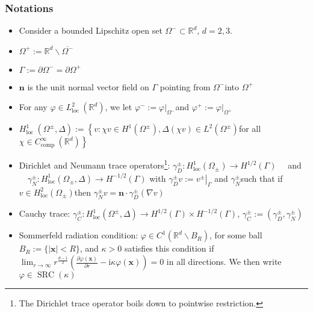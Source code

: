 \documentclass[10pt,journal,compsoc, onecolumn]{IEEEtran}
\begin{document}
\subsubsection{Notations}
\begin{itemize}
    \item Consider a bounded Lipschitz open set $\Omega^{-} \subset \mathbb{R}^{d}$, $d=2,3$.
    \item \(\Omega^{+}:=\mathbb{R}^{d} \backslash \overline{\Omega^{-}}\)
    \item \(\Gamma:=\partial \Omega^{-}=\partial \Omega^{+}\)
    \item \(\mathbf{n}\) is the unit normal vector field on \(\Gamma\) pointing from \(\Omega^{-}\)into \(\Omega^{+}\)
    \item For any \(\varphi \in L_{\text {loc }}^{2}\left(\mathbb{R}^{d}\right)\), we let \(\varphi^{-}:=\left.\varphi\right|_{\Omega^{-}}\)and \(\varphi^{+}:=\left.\varphi\right|_{\Omega^{+}}\)
    \item \(H_{\text {loc }}^{1}\left(\Omega^{\pm}, \Delta\right):=\left\{v: \chi v \in H^{1}\left(\Omega^{\pm}\right), \Delta(\chi v) \in L^{2}\left(\Omega^{\pm}\right)\right.\)for all \(\left.\chi \in C_{\text {comp }}^{\infty}\left(\mathbb{R}^{d}\right)\right\}\)
    \item Dirichlet and Neumann trace operators\footnote{The Dirichlet trace operator boils down to pointwise restriction.}: \(\gamma_{D}^{\pm}: H_{\mathrm{loc}}^{1}\left(\Omega_{\pm}\right) \rightarrow H^{1 / 2}(\Gamma) \quad\) and \(\quad \gamma_{N}^{\pm}: H_{\mathrm{loc}}^{1}\left(\Omega_{\pm}, \Delta\right) \rightarrow H^{-1 / 2}(\Gamma)\) with \(\gamma_{D}^{\pm} v:=\left.v^{\pm}\right|_{\Gamma}\) and \(\gamma_{N}^{\pm}\)such that if \(v \in H_{\mathrm{loc}}^{2}\left(\Omega_{\pm}\right)\)then \(\gamma_{N}^{\pm} v=\mathbf{n} \cdot \gamma_{D}^{\pm}(\nabla v)\)
    \item Cauchy trace: \(\gamma_{C}^{\pm}: H_{\mathrm{loc}}^{1}\left(\Omega^{\pm}, \Delta\right) \rightarrow H^{1 / 2}(\Gamma) \times H^{-1 / 2}(\Gamma)\), \(\gamma_{C}^{\pm}:=\left(\gamma_{D}^{\pm}, \gamma_{N}^{\pm}\right)\)
    \item Sommerfeld radiation condition: \(\varphi \in C^{1}\left(\mathbb{R}^{d} \backslash B_{R}\right)\), for some ball \(B_{R}:=\{|\mathbf{x}|<R\}\), and \(\kappa>0\) satisfies this condition if \(\lim _{r \rightarrow \infty} r^{\frac{d-1}{2}}\left(\frac{\partial \varphi(\mathbf{x})}{\partial r}-\mathrm{i} \kappa \varphi(\mathbf{x})\right)=0\) in all directions. We then write \(\varphi \in \operatorname{SRC}(\kappa)\)
\end{itemize}
\end{document}

